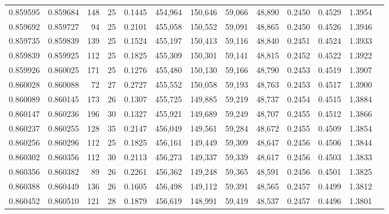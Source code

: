 \begin{tabular}{rrrrrrrrrrrrr}
0.859595 & 0.859684 &   148 &  25 &                                     0.1445 & 454,964 & 150,646 &  59,066 &  48,890 & 0.2450 & 0.4529 & 1.3954 \\
0.859692 & 0.859727 &    94 &  25 &                                     0.2101 & 455,058 & 150,552 &  59,091 &  48,865 & 0.2450 & 0.4526 & 1.3946 \\
0.859735 & 0.859839 &   139 &  25 &                                     0.1524 & 455,197 & 150,413 &  59,116 &  48,840 & 0.2451 & 0.4524 & 1.3933 \\
0.859839 & 0.859925 &   112 &  25 &                                     0.1825 & 455,309 & 150,301 &  59,141 &  48,815 & 0.2452 & 0.4522 & 1.3922 \\
0.859926 & 0.860025 &   171 &  25 &                                     0.1276 & 455,480 & 150,130 &  59,166 &  48,790 & 0.2453 & 0.4519 & 1.3907 \\
0.860028 & 0.860088 &    72 &  27 &                                     0.2727 & 455,552 & 150,058 &  59,193 &  48,763 & 0.2453 & 0.4517 & 1.3900 \\
0.860089 & 0.860145 &   173 &  26 &                                     0.1307 & 455,725 & 149,885 &  59,219 &  48,737 & 0.2454 & 0.4515 & 1.3884 \\
0.860147 & 0.860236 &   196 &  30 &                                     0.1327 & 455,921 & 149,689 &  59,249 &  48,707 & 0.2455 & 0.4512 & 1.3866 \\
0.860237 & 0.860255 &   128 &  35 &                                     0.2147 & 456,049 & 149,561 &  59,284 &  48,672 & 0.2455 & 0.4509 & 1.3854 \\
0.860256 & 0.860296 &   112 &  25 &                                     0.1825 & 456,161 & 149,449 &  59,309 &  48,647 & 0.2456 & 0.4506 & 1.3844 \\
0.860302 & 0.860356 &   112 &  30 &                                     0.2113 & 456,273 & 149,337 &  59,339 &  48,617 & 0.2456 & 0.4503 & 1.3833 \\
0.860356 & 0.860382 &    89 &  26 &                                     0.2261 & 456,362 & 149,248 &  59,365 &  48,591 & 0.2456 & 0.4501 & 1.3825 \\
0.860388 & 0.860449 &   136 &  26 &                                     0.1605 & 456,498 & 149,112 &  59,391 &  48,565 & 0.2457 & 0.4499 & 1.3812 \\
0.860452 & 0.860510 &   121 &  28 &                                     0.1879 & 456,619 & 148,991 &  59,419 &  48,537 & 0.2457 & 0.4496 & 1.3801 \\

\end{tabular}

